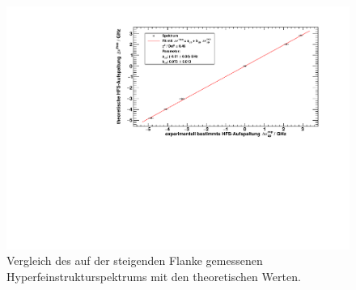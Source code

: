 \begin{figure}[H]
\begin{center}
    \includegraphics[width=\textwidth]{../img/part2/up-spectrum.pdf}
    \caption{Vergleich des auf der steigenden Flanke gemessenen Hyperfeinstrukturspektrums mit den theoretischen Werten.}
    \label{img:hfs:spectrum:up}
\end{center}
\end{figure}


